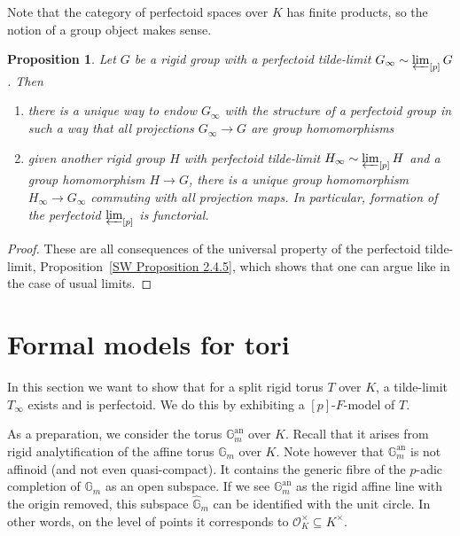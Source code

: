 \documentclass[10pt,oneside]{amsart}
\newtheorem{proposition}[theorem]{Proposition}
\theoremstyle{definition}
\begin{document}
			Note that the category of perfectoid spaces over $K$ has finite products, so the notion of a group object makes sense. 
	
	\begin{proposition}\label{perfectoid tilde-limit is perfectoid group in a functorial way}
		Let $G$ be a rigid group with a perfectoid tilde-limit $G_\infty\sim \varprojlim_{[p]}G$. Then
		\begin{enumerate}
		\item  there is a unique way to endow $G_\infty$ with the structure of a perfectoid group in such a way that all projections $G_\infty\rightarrow G$ are group homomorphisms
		\item given another rigid group $H$ with perfectoid tilde-limit $H_\infty\sim\varprojlim_{[p]}H$ and a group homomorphism $H\rightarrow G$, there is a unique group homomorphism $H_\infty\rightarrow G_\infty$
		commuting with all projection maps. In particular, formation of the perfectoid $\varprojlim_{[p]}$ is functorial.
	\end{enumerate}
	\end{proposition}
	\begin{proof}
		These are all consequences of the universal property of the perfectoid tilde-limit, Proposition~\ref{SW Proposition 2.4.5}, which shows that one can argue like in the case of usual limits.
	\end{proof}


	\section{Formal models for tori}
	
	In this section we want to show that for a split rigid torus $T$ over $K$, a tilde-limit $T_\infty$ exists and is perfectoid. We do this by exhibiting a $[p]$-$F$-model of $T$.
	
	As a preparation, we consider the torus $\mathbb G_m^{\operatorname{an}}$ over $K$. Recall that it arises from rigid analytification of the affine torus $\mathbb G_m$ over $K$. Note however that $\mathbb G_m^{\operatorname{an}}$ is not affinoid (and not even quasi-compact). It contains the generic fibre of the $p$-adic completion of $\mathbb G_m$ as an open subspace. If we see $\mathbb G_m^{\operatorname{an}}$ as the rigid affine line with the origin removed, this subspace $\widehat{\mathbb G}_m$ can be identified with the unit circle. In other words, on the level of points it corresponds to $\mathcal O_K^\times \subseteq K^\times$.
	
\end{document}
